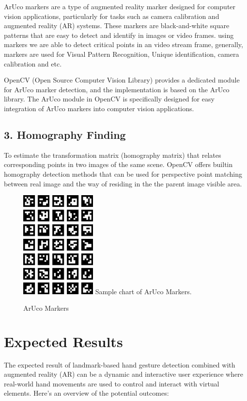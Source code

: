\documentclass[journal]{IEEEtran}
\begin{document}
ArUco markers are a type of augmented reality marker designed for computer vision applications, particularly for tasks such as 
camera calibration and augmented reality (AR) systems. These markers are black-and-white square patterns that are easy to detect 
and identify in images or video frames. using markers we are able to detect critical points in an video stream frame, generally, 
markers are used for Visual Pattern Recognition, Unique identification, camera calibration and etc. 

OpenCV (Open Source Computer Vision Library) provides a dedicated module for ArUco marker detection, and the implementation is 
based on the ArUco library. The ArUco module in OpenCV is specifically designed for easy integration of ArUco markers into 
computer vision applications.

\subsection*{3. Homography Finding}

To estimate the transformation matrix (homography matrix) that relates corresponding points in two images of the same scene. OpenCV
offers builtin homography detection methods that can be used for perspective point matching between real image and the way of residing 
in the the parent image visible area.

\begin{figure}[!t]
  \centering
  \includegraphics[width=1.5in]{photo/aruco-markers.png}
  Sample chart of ArUco Markers.
  \caption{ArUco Markers}
  \label{fig_sim}
\end{figure}

\section{Expected Results}

The expected result of landmark-based hand gesture detection combined with augmented reality (AR) can be a dynamic and interactive 
user experience where real-world hand movements are used to control and interact with virtual elements. 
Here's an overview of the potential outcomes:
\end{document}
